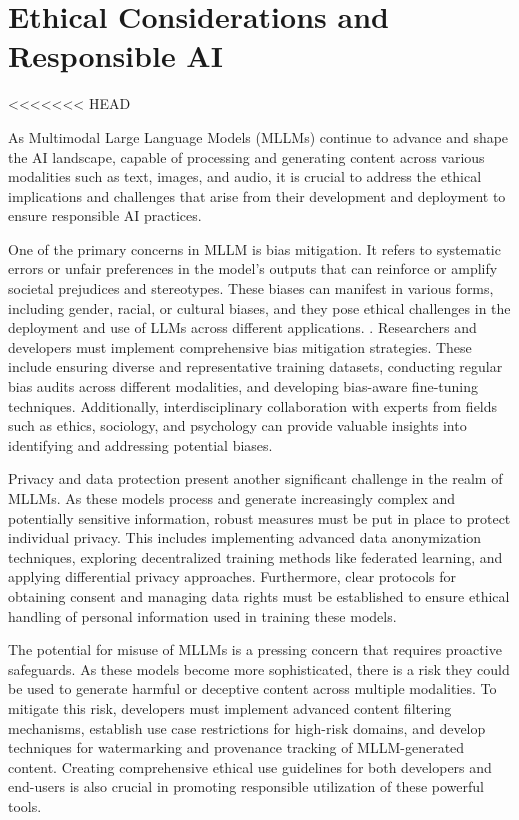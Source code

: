 \chapter{Ethical Considerations and Responsible AI}

<<<<<<< HEAD



As Multimodal Large Language Models (MLLMs) continue to advance and shape the AI landscape, capable of processing and generating content across various modalities such as text, images, and audio, it is crucial to address the ethical implications and challenges that arise from their development and deployment to ensure responsible AI practices\cite{konidena2024ethical}. 

One of the primary concerns in MLLM is bias mitigation. It refers to systematic errors or unfair preferences in the model's outputs that can reinforce or amplify societal prejudices and stereotypes. These biases can manifest in various forms, including gender, racial, or cultural biases, and they pose ethical challenges in the deployment and use of LLMs across different applications.
\cite{peng2024securing}. Researchers and developers must implement comprehensive bias mitigation strategies\cite{zhang2023mitigating}. These include ensuring diverse and representative training datasets, conducting regular bias\cite{boix2022machine} audits across different modalities\cite{pymetrics2022audit}, and developing bias-aware fine-tuning techniques\cite{kim2024domain}. Additionally, interdisciplinary collaboration with experts from fields such as ethics, sociology, and psychology can provide valuable insights into identifying and addressing potential biases\cite{aquino2023practical}.

Privacy and data protection present another significant challenge in the realm of MLLMs. As these models process and generate increasingly complex and potentially sensitive information, robust measures must be put in place to protect individual privacy\cite{he2024emerged, friha2024llm}. This includes implementing advanced data anonymization techniques, exploring decentralized training methods like federated learning, and applying differential privacy approaches. Furthermore, clear protocols for obtaining consent and managing data rights must be established to ensure ethical handling of personal information used in training these models\cite{mccoy2023ethical}.

The potential for misuse of MLLMs is a pressing concern that requires proactive safeguards. As these models become more sophisticated, there is a risk they could be used to generate harmful or deceptive content across multiple modalities\cite{chen2024trustworthy}. To mitigate this risk, developers must implement advanced content filtering mechanisms, establish use case restrictions for high-risk domains, and develop techniques for watermarking and provenance tracking of MLLM-generated content. Creating comprehensive ethical use guidelines for both developers and end-users is also crucial in promoting responsible utilization of these powerful tools.

